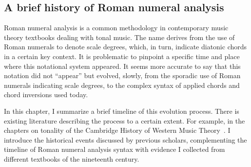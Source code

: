 \subsection{A brief history of Roman numeral analysis}
\label{sec:a_brief_history_of_roman_numeral_analysis}

Roman numeral analysis is a common methodology in contemporary music theory textbooks dealing with tonal music.
The name derives from the use of Roman numerals to denote scale degrees, which, in turn, indicate diatonic chords in a certain key context.
It is problematic to pinpoint a specific time and place where this notational system appeared.
It seems more accurate to say that this notation did not ``appear'' but evolved, slowly, from the sporadic use of Roman numerals indicating scale degrees, to the complex syntax of applied chords and chord inversions used today.

In this chapter, I summarize a brief timeline of this evolution process.
There is existing literature describing the process to a certain extent.
For example, in the chapters on tonality of the Cambridge History of Western Music Theory~\parencite{christensen_tonality_2002, christensen_rameau_2002, christensen_nineteenth-century_2002, christensen_heinrich_2002}.
I introduce the historical events discussed by previous scholars, complementing the timeline of Roman numeral analysis syntax with evidence I collected from different textbooks of the nineteenth century.

